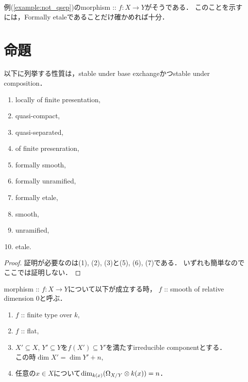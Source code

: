 \documentclass[a4paper]{jsarticle}
\begin{document}
\begin{Example}
    例(\ref{example:not_qsep})のmorphism :: $f \colon X \to Y$がそうである．
    このことを示すには，Formally etaleであることだけ確かめれば十分．
\end{Example}

\section{命題}
\begin{Prop} \label{prop:stable_property}
    以下に列挙する性質は，stable under base exchangeかつstable under composition．
    \begin{enumerate}[label=(\arabic*)]
        \item locally of finite presentation,
        \item quasi-compact,
        \item quasi-separated,
        \item of finite presenration,
        \item formally smooth,
        \item formally unramified,
        \item formally etale,
        \item smooth,
        \item unramified,
        \item etale.
    \end{enumerate}    
\end{Prop}
\begin{proof}
    証明が必要なのは(1), (2), (3)と(5), (6), (7)である．
    いずれも簡単なのでここでは証明しない．
\end{proof}

\begin{Def}
    morphism :: $f \colon X \to Y$について以下が成立する時，
    $f$ :: smooth of relative dimension $0$と呼ぶ．
    \begin{enumerate}
        \item $f$ :: finite type over $k$,
        \item $f$ :: flat,
        \item
            $X' \subseteq X$, $Y' \subseteq Y$を$f(X') \subseteq Y'$を満たすirreducible componentとする． \mbox{} \\
            この時$\dim X'=\dim Y'+n$,
        \item 任意の$x \in X$について$\dim_{k(x)} (\Omega_{X/Y} \otimes k(x))=n$．
    \end{enumerate}
\end{Def}
\end{document}
